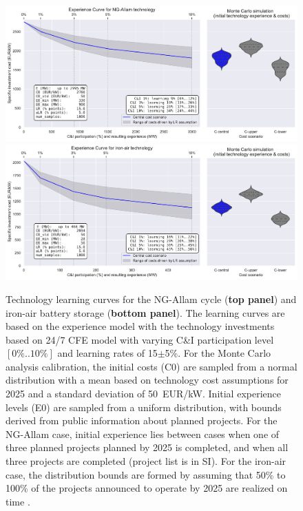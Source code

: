 \documentclass[pdflatex,sn-basic, Numbered]{sn-jnl}
\theoremstyle{thmstyleone}%
\theoremstyle{thmstyletwo}%
\theoremstyle{thmstylethree}%
\begin{document}
\begin{figure}[htbp]
    \centering
    \includegraphics[width=\textwidth]{images/e_curve_NG-Allam.pdf}
    \includegraphics[width=\textwidth]{images/e_curve_iron-air.pdf}
    \caption{Technology learning curves for the NG-Allam cycle (\textbf{top panel}) and iron-air battery storage (\textbf{bottom panel}).
    The learning curves are based on the experience model with the technology investments based on 24/7 CFE model with varying C\&I participation level $[0\%..10\%]$ and learning rates of 15$\pm$5\%.
    For the Monte Carlo analysis calibration, the initial costs (C0) are sampled from a normal distribution with a mean based on technology cost assumptions for 2025 and a standard deviation of 50~EUR/kW. Initial experience levels (E0) are sampled from a uniform distribution, with bounds derived from public information about planned projects. For the NG-Allam case, initial experience lies between cases when one of three planned projects planned by 2025 is completed, and when all three projects are completed (project list is in SI). For the iron-air case, the distribution bounds are formed by assuming that 50\% to 100\% of the projects announced to operate by 2025 are realized on time \cite{FormEnergyLatest2024}.
    }
    \label{fig:panels}
\end{figure}
\end{document}
